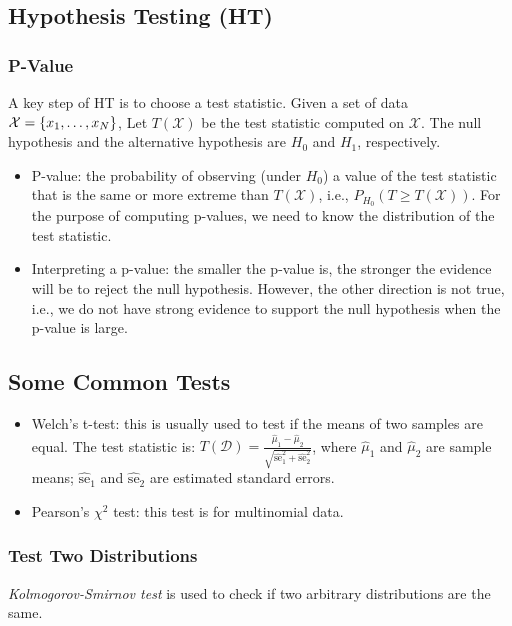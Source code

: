 

\subsection{Hypothesis Testing (HT)}
    \subsubsection{P-Value}
    A key step of HT is to choose a test statistic.
    Given a set of data $\mathcal{X} = \{ x_1, \ldots, x_N \}$, 
    Let $T(\mathcal{X})$ be the test statistic computed on $\mathcal{X}$.
    The null hypothesis and the alternative hypothesis are $H_0$ and $H_1$, respectively.
    \begin{itemize}
        \item P-value: the probability of observing (under $H_0$) a value of the test statistic that is the same or more extreme than $T(\mathcal{X})$, i.e., $P_{H_0}(T \ge T(\mathcal{X}))$. 
        For the purpose of computing p-values, we need to know the distribution of the test statistic.
        \item Interpreting a p-value: the smaller the p-value is, the stronger the evidence will be to reject the null hypothesis. However, the other direction is not true, i.e., we do not have strong evidence to support the null hypothesis when the p-value is large.
    \end{itemize}
    
    \subsection{Some Common Tests}
        \begin{itemize}
            \item Welch's t-test: this is usually used to test if the means of two samples are equal.
            The test statistic is: $T(\mathcal{D}) = \frac{\hat{\mu}_1 - \hat{\mu}_2}{\sqrt{ \hat{\text{se}}_1^2 +  \hat{\text{se}}_2^2  }}$, where $\hat{\mu}_1$ and $\hat{\mu}_2$ are sample means; $\hat{\text{se}}_1$ and $\hat{\text{se}}_2$ are estimated standard errors.
            \item Pearson's $\chi^2$ test: this test is for multinomial data.
        \end{itemize}
    
    \subsubsection{Test Two Distributions}
     \emph{Kolmogorov-Smirnov test} is used to check if two arbitrary distributions are the same.
     
